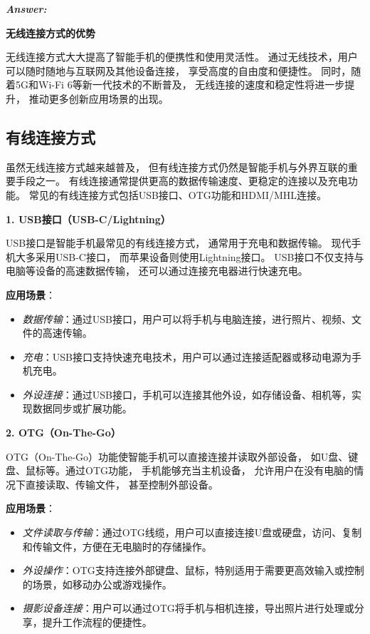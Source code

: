 \documentclass[12pt]{article}
\newenvironment{Answer}{
  \vspace{12pt}
  {\large\textbf{\textit{\hspace{-12pt}Answer:}}}\par
  \vspace{8pt}
} {\vspace{24pt}}
\begin{document}
\begin{Answer}
\noindent\textbf{无线连接方式的优势}\noindent

无线连接方式大大提高了智能手机的便携性和使用灵活性。
通过无线技术，用户可以随时随地与互联网及其他设备连接，
享受高度的自由度和便捷性。
同时，随着5G和Wi-Fi 6等新一代技术的不断普及，
无线连接的速度和稳定性将进一步提升，
推动更多创新应用场景的出现。

\subsection*{有线连接方式}\noindent

虽然无线连接方式越来越普及，
但有线连接方式仍然是智能手机与外界互联的重要手段之一。
有线连接通常提供更高的数据传输速度、更稳定的连接以及充电功能。
常见的有线连接方式包括USB接口、OTG功能和HDMI/MHL连接。

\noindent\textbf{1. USB接口（USB-C/Lightning）}\noindent

USB接口是智能手机最常见的有线连接方式，
通常用于充电和数据传输。
现代手机大多采用USB-C接口，
而苹果设备则使用Lightning接口。
USB接口不仅支持与电脑等设备的高速数据传输，
还可以通过连接充电器进行快速充电。

\textbf{应用场景}：
\begin{itemize}
    \item \textit{数据传输}：通过USB接口，用户可以将手机与电脑连接，进行照片、视频、文件的高速传输。
    \item \textit{充电}：USB接口支持快速充电技术，用户可以通过连接适配器或移动电源为手机充电。
    \item \textit{外设连接}：通过USB接口，手机可以连接其他外设，如存储设备、相机等，实现数据同步或扩展功能。
\end{itemize}

\noindent\textbf{2. OTG（On-The-Go）}\noindent

OTG（On-The-Go）功能使智能手机可以直接连接并读取外部设备，
如U盘、键盘、鼠标等。通过OTG功能，
手机能够充当主机设备，
允许用户在没有电脑的情况下直接读取、传输文件，
甚至控制外部设备。

\textbf{应用场景}：
\begin{itemize}
    \item \textit{文件读取与传输}：通过OTG线缆，用户可以直接连接U盘或硬盘，访问、复制和传输文件，方便在无电脑时的存储操作。
    \item \textit{外设操作}：OTG支持连接外部键盘、鼠标，特别适用于需要更高效输入或控制的场景，如移动办公或游戏操作。
    \item \textit{摄影设备连接}：用户可以通过OTG将手机与相机连接，导出照片进行处理或分享，提升工作流程的便捷性。
\end{itemize}


\end{Answer}
\end{document}
